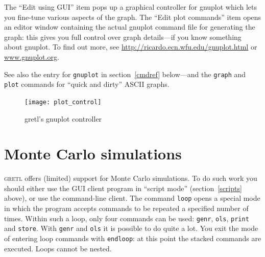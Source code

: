 \documentclass{article}
\begin{document}
The ``Edit using GUI'' item pops up a graphical controller for gnuplot
which lets you fine-tune various aspects of the graph.  The ``Edit
plot commands'' item opens an editor window containing the actual
gnuplot command file for generating the graph: this gives you full
control over graph details---if you know something about gnuplot. To
find out more, see \url{http://ricardo.ecn.wfu.edu/gnuplot.html} or
\url{www.gnuplot.org}.


See also the entry for \texttt{gnuplot} in section~\ref{cmdref}
below---and the \texttt{graph} and \texttt{plot} commands for 
``quick and dirty'' ASCII graphs.

\begin{figure}[htbp]
  \begin{center}
    \texttt{[image: plot\_control]}
    \caption{gretl's gnuplot controller}
    \label{fig:plot}
  \end{center}
\end{figure}

\section{Monte Carlo simulations}
\label{monte}

\textsc{gretl} offers (limited) support for Monte Carlo simulations.
To do such work you should either use the GUI client program in
``script mode'' (section~\ref{scripts} above), or use the command-line
client.  The command \texttt{loop} opens a special mode in which the
program accepts commands to be repeated a specified number of times.
Within such a loop, only four commands can be used: \texttt{genr},
\texttt{ols}, \texttt{print} and \texttt{store}.  With \texttt{genr}
and \texttt{ols} it is possible to do quite a lot. You exit the mode
of entering loop commands with \texttt{endloop}: at this point the
stacked commands are executed.  Loops cannot be nested.
\end{document}
